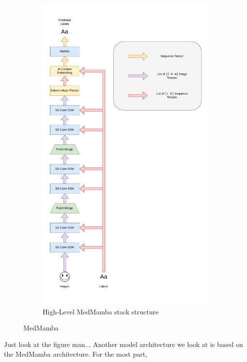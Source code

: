 \begin{figure}[ht]
\begin{subfigure}{0.5\textwidth}
        \includegraphics[width=\textwidth]{figures/medmamba_stack.pdf}
        \caption{High-Level MedMamba stack structure}
        \label{medmambastackhigh}
    \end{subfigure}
    \caption{MedMamba}
    \label{medmambastack}
\end{figure}
Just look at the figure man...
Another model architecture we look at is based on the MedMamba
architecture\cite{medmamba}.
For the most part, 


